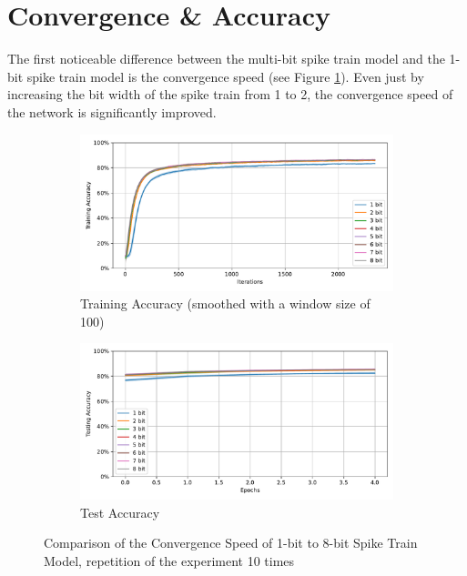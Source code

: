 \section{Convergence \& Accuracy}
\label{sec:convergence_accuracy}
    The first noticeable difference between the multi-bit spike train model and the 1-bit spike train model is the convergence speed (see Figure \ref{fig:convergence_speed}). Even just by increasing the bit width of the spike train from 1 to 2, the convergence speed of the network is significantly improved. 
    \begin{figure}[!htpb]
        \centering
        \begin{subfigure}[H]{\textwidth}
            \centering
            \includegraphics[width=\textwidth]{../standard/FashionMNIST/plots/fashionmnist_train_acc.pdf}
            \caption{Training Accuracy (smoothed with a window size of 100)}
        \end{subfigure}
        \hfill
        \begin{subfigure}[H]{\textwidth}
            \centering
            \includegraphics[width=\textwidth]{../standard/FashionMNIST/plots/fashionmnist_test_acc.pdf}
            \caption{Test Accuracy}
        \end{subfigure}
        \caption{Comparison of the Convergence Speed of 1-bit to 8-bit Spike Train Model, repetition of the experiment 10 times}
        \label{fig:convergence_speed}
    \end{figure}

